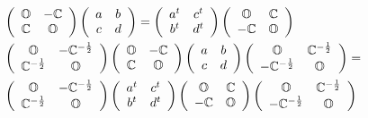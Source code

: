 \documentclass[aps,preprint]{revtex4}%
\begin{document}
\begin{align}
&  \left(
\begin{array}
[c]{cc}%
\mathbb{O} & -\mathbb{C}\\
\mathbb{C} & \mathbb{O}%
\end{array}
\right)  \left(
\begin{array}
[c]{cc}%
a & b\\
c & d
\end{array}
\right)  =\left(
\begin{array}
[c]{cc}%
a^{t} & c^{t}\\
b^{t} & d^{t}%
\end{array}
\right)  \left(
\begin{array}
[c]{cc}%
\mathbb{O} & \mathbb{C}\\
-\mathbb{C} & \mathbb{O}%
\end{array}
\right)  \\
&  \left(
\begin{array}
[c]{cc}%
\mathbb{O} & -\mathbb{C}^{-\frac{1}{2}}\\
\mathbb{C}^{-\frac{1}{2}} & \mathbb{O}%
\end{array}
\right)  \left(
\begin{array}
[c]{cc}%
\mathbb{O} & -\mathbb{C}\\
\mathbb{C} & \mathbb{O}%
\end{array}
\right)  \left(
\begin{array}
[c]{cc}%
a & b\\
c & d
\end{array}
\right)  \left(
\begin{array}
[c]{cc}%
\mathbb{O} & \mathbb{C}^{-\frac{1}{2}}\\
-\mathbb{C}^{-\frac{1}{2}} & \mathbb{O}%
\end{array}
\right)  =\\
&  \left(
\begin{array}
[c]{cc}%
\mathbb{O} & -\mathbb{C}^{-\frac{1}{2}}\\
\mathbb{C}^{-\frac{1}{2}} & \mathbb{O}%
\end{array}
\right)  \left(
\begin{array}
[c]{cc}%
a^{t} & c^{t}\\
b^{t} & d^{t}%
\end{array}
\right)  \left(
\begin{array}
[c]{cc}%
\mathbb{O} & \mathbb{C}\\
-\mathbb{C} & \mathbb{O}%
\end{array}
\right)  \left(
\begin{array}
[c]{cc}%
\mathbb{O} & \mathbb{C}^{-\frac{1}{2}}\\
-\mathbb{C}^{-\frac{1}{2}} & \mathbb{O}%
\end{array}
\right)
\end{align}%
\end{document}
